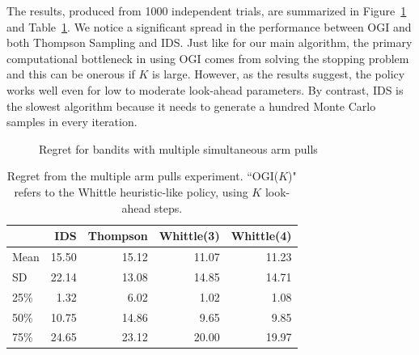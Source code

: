 The results, produced from 1000 independent trials, are summarized in Figure~\ref{fig:restless1} and Table~\ref{table:restless1_summary}. We notice a significant spread in the performance between OGI and both Thompson Sampling and IDS. Just like for our main algorithm, the primary computational bottleneck in using OGI comes from solving the stopping problem and this can be onerous if $K$ is large. However, as the results suggest, the policy works well even for low to moderate look-ahead parameters. By contrast, IDS is the slowest algorithm because it needs to generate a hundred Monte Carlo samples in every iteration.
\begin{figure}
	\centering
	
	\caption{Regret for bandits with multiple simultaneous arm pulls}
	\label{fig:restless1}
\end{figure}

\begin{table}
	\centering
	\begin{tabular}{lrrrr}
		\toprule
		{} &   IDS &  Thompson &  Whittle(3) &  Whittle(4) \\
		\midrule
		Mean      & 15.50 &     15.12 &       11.07 &       11.23 \\
		SD       & 22.14 &     13.08 &       14.85 &       14.71 \\
		25\% &  1.32 &      6.02 &        1.02 &        1.08 \\
		50\%    & 10.75 &     14.86 &        9.65 &        9.85 \\
		75\% & 24.65 &     23.12 &       20.00 &       19.97 \\
		\bottomrule
	\end{tabular}
	
	\caption{Regret from the multiple arm pulls experiment. ``OGI($K$)" refers to the Whittle heuristic-like policy, using $K$ look-ahead steps.}
	\label{table:restless1_summary}
\end{table}
